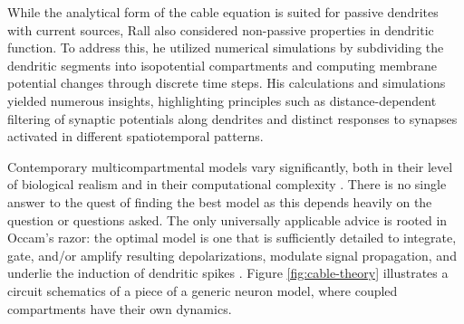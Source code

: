 \documentclass[../main.tex]{subfiles}
\begin{document}
While the analytical form of the cable equation is suited for passive dendrites with current sources, Rall also considered non-passive properties in dendritic function. 
To address this, he utilized numerical simulations by subdividing the dendritic segments into isopotential compartments and computing membrane potential changes through discrete time steps.
His calculations and simulations yielded numerous insights, highlighting principles such as distance-dependent filtering of synaptic potentials along dendrites and distinct responses to synapses activated in different spatiotemporal patterns.

Contemporary multicompartmental models vary significantly, both in their level of biological realism and in their computational complexity \citep{poirazi_arithmetic_2003,cutsuridis_computational_2015,chavlis_dendrites_2017,tzilivaki_hippocampal_2023}.
There is no single answer to the quest of finding the best model as this depends heavily on the question or questions asked.
The only universally applicable advice is rooted in Occam’s razor: the optimal model is one that is sufficiently detailed to integrate, gate, and/or amplify resulting depolarizations, modulate signal propagation, and underlie the induction of dendritic spikes \citep{poirazi_illuminating_2020}.
Figure \ref{fig:cable-theory} illustrates a circuit schematics of a piece of a generic neuron model, where coupled compartments have their own dynamics.
\end{document}
